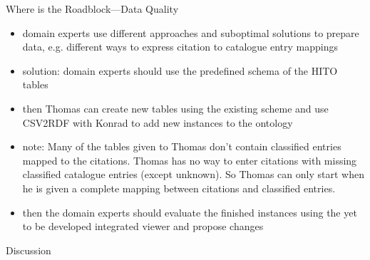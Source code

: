 \documentclass[aspectratio=1610]{beamer}
\begin{document}
\begin{frame}{Where is the Roadblock---Data Quality}
\begin{itemize}
  \item domain experts use different approaches and suboptimal solutions to prepare data, e.g. different ways to express citation to catalogue entry mappings
  \item solution: domain experts should use the predefined schema of the HITO tables
  \item then Thomas can create new tables using the existing scheme and use CSV2RDF with Konrad to add new instances to the ontology
  \item note: Many of the tables given to Thomas don't contain classified entries mapped to the citations. Thomas has no way to enter citations with missing classified catalogue entries (except unknown). So Thomas can only start when he is given a complete mapping between citations and classified entries.
  \item then the domain experts should evaluate the finished instances using the yet to be developed integrated viewer and propose changes
\end{itemize}
\end{frame}

\begin{frame}{Discussion}
\end{frame}
\end{document}
